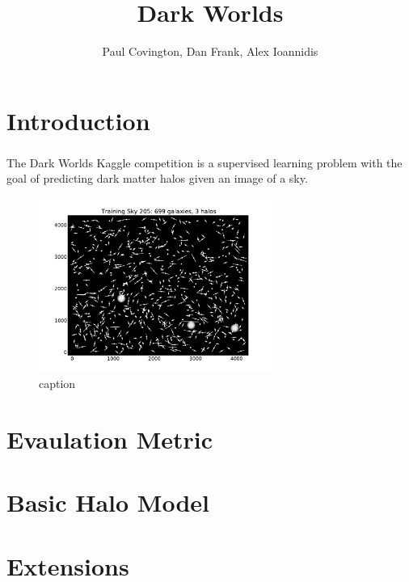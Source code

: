 \documentclass{article}
\title{Dark Worlds} \author{Paul Covington, Dan Frank, Alex Ioannidis}
\begin{document}
\maketitle

\section{Introduction}
The Dark Worlds Kaggle \textsuperscript{\texttrademark} competition is a supervised learning problem with the goal of predicting dark matter halos given an image of a sky.

\begin{figure}[htbp]
  \centering
  \label{fig:sky}
  \includegraphics[width=3in]{figs/sky.pdf}
  \caption{caption}
\end{figure}

\section{Evaulation Metric}

\section{Basic Halo Model}

\section{Extensions}
\end{document}
